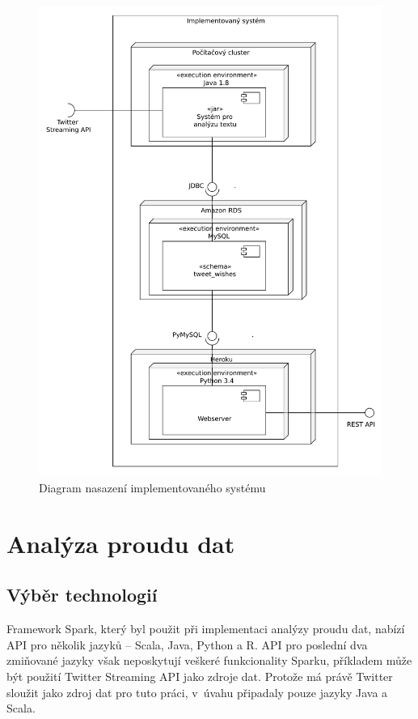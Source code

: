 \documentclass[thesis=B,czech]{FITthesis}[2012/06/26]
\begin{document}
\begin{figure}[h!]
   	\centering
   	\includegraphics[width=1\textwidth]{images/deployment.pdf}
   	\caption{Diagram nasazení implementovaného systému}
   	\label{fig:deployment_diagram}
\end{figure}

\section{Analýza proudu dat}
\label{analysis-implementation}
\subsection{Výběr technologií}
Framework Spark, který byl použit při implementaci analýzy proudu dat, nabízí API pro několik jazyků -- Scala, Java, Python a R. API pro poslední dva zmiňované jazyky však neposkytují veškeré funkcionality Sparku, příkladem může být použití Twitter Streaming API jako zdroje dat\cite{streaming-guide}. Protože má právě Twitter sloužit jako zdroj dat pro tuto práci, v~úvahu připadaly pouze jazyky Java a Scala. 
\end{document}
